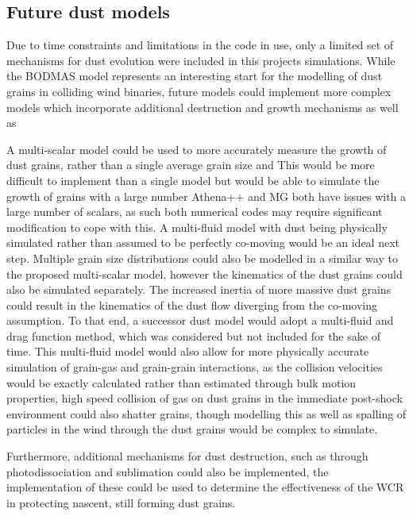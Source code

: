 \subsection{Future dust models}


Due to time constraints and limitations in the code in use, only a limited set of mechanisms for dust evolution were included in this projects simulations.
While the BODMAS model represents an interesting start for the modelling of dust grains in colliding wind binaries, future models could implement more complex models which incorporate additional destruction and growth mechanisms as well as 

A multi-scalar model could be used to more accurately measure the growth of dust grains, rather than a single average grain size and 
This would be more difficult to implement than a single model but would be able to simulate the growth of grains with a large number 
Athena++ and MG both have issues with a large number of scalars, as such both numerical codes may require significant modification to cope with this.
A multi-fluid model with dust being physically simulated rather than assumed to be perfectly co-moving would be an ideal next step.
Multiple grain size distributions could also be modelled in a similar way to the proposed multi-scalar model, however the kinematics of the dust grains could also be simulated separately.
The increased inertia of more massive dust grains could result in the kinematics of the dust flow diverging from the co-moving assumption.
To that end, a successor dust model would adopt a multi-fluid and drag function method, which was considered but not included for the sake of time.
This multi-fluid model would also allow for more physically accurate simulation of grain-gas and grain-grain interactions, as the collision velocities would be exactly calculated rather than estimated through bulk motion properties, high speed collision of gas on dust grains in the immediate post-shock environment could also shatter grains, though modelling this as well as spalling of particles in the wind through the dust grains would be complex to simulate. 

Furthermore, additional mechanisms for dust destruction, such as through photodissociation and sublimation could also be implemented, the implementation of these could be used to determine the effectiveness of the WCR in protecting nascent, still forming dust grains.

